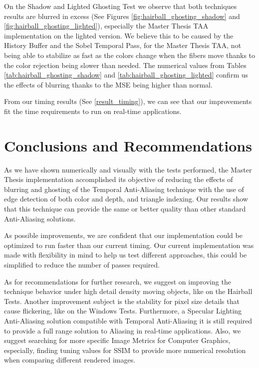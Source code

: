 \documentclass{cslthse-msc}
\begin{document}
On the Shadow and Lighted Ghosting Test we observe that both techniques results are blurred in excess (See Figures \ref{fig:hairball_ghosting_shadow} and \ref{fig:hairball_ghosting_lighted}), especially the Master Thesis TAA implementation on the lighted version. We believe this to be caused by the History Buffer and the Sobel Temporal Pass, for the Master Thesis TAA, not being able to stabilize as fast as the colors change when the fibers move thanks to the color rejection being slower than needed. The numerical values from Tables \ref{tab:hairball_ghosting_shadow} and \ref{tab:hairball_ghosting_lighted} confirm us the effects of blurring thanks to the MSE being higher than normal.


From our timing results (See \ref{result_timing}), we can see that our improvements fit the time requirements to run on real-time applications.


\chapter{Conclusions and Recommendations}
As we have shown numerically and visually with the tests performed, the Master Thesis implementation accomplished its objective of reducing the effects of blurring and ghosting of the Temporal Anti-Aliasing technique with the use of edge detection of both color and depth, and triangle indexing. Our results show that this technique can provide the same or better quality than other standard Anti-Aliasing solutions. 

As possible improvements, we are confident that our implementation could be optimized to run faster than our current timing. Our current implementation was made with flexibility in mind to help us test different approaches, this could be simplified to reduce the number of passes required. 

As for recommendations for further research, we suggest on improving the technique behavior under high detail density moving objects, like on the Hairball Tests. Another improvement subject is the stability for pixel size details that cause flickering, like on the Windows Tests. Furthermore, a Specular Lighting Anti-Aliasing solution compatible with Temporal Anti-Aliasing it is still required to provide a full range solution to Aliasing in real-time applications. Also, we suggest searching for more specific Image Metrics for Computer Graphics, especially, finding tuning values for SSIM to provide more numerical resolution when comparing different rendered images.
\end{document}
